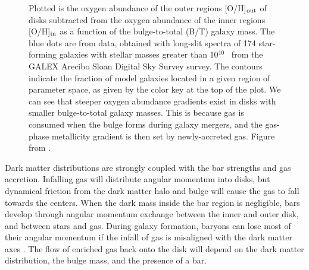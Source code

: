 \documentclass[11pt, a4paper, onecolumn]{article}
\begin{document}
\begin{multicols}{2}
\begin{figure}[!ht]
        \caption{\label{fig:fu} Plotted is the oxygen abundance of the outer
            regions [O/H]$_{\rm out}$ of disks subtracted from the oxygen
            abundance of the inner regions [O/H]$_{\rm in}$ as a function of
            the bulge-to-total (B/T) galaxy mass. The blue dots are from
            \citet{moran12} data, obtained with long-slit spectra of 174
            star-forming galaxies with stellar masses greater than 10$^{10}$
            \msun\ from the GALEX Arecibo Sloan Digital Sky Survey survey. The
            contours indicate the fraction of model galaxies located in a given
            region of parameter space, as given by the color key at the top of
            the plot. We can see that steeper oxygen abundance gradients exist
            in disks with smaller bulge-to-total galaxy masses.  This is
            because gas is consumed when the bulge forms during galaxy mergers,
            and the gas-phase metallicity gradient is then set by
        newly-accreted gas. Figure from \citet{fu13}.\/}

    \end{figure}

    Dark matter distributions are strongly coupled with the bar strengths and
    gas accretion. Infalling gas will distribute angular momentum into
    disks, but dynamical friction from the dark matter halo and bulge will
    cause the gas to fall towards the centers. When the dark mass inside the
    bar region is negligible, bars develop through angular momentum exchange
    between the inner and outer disk, and between stars and gas. During galaxy
    formation, baryons can lose most of their angular momentum if the infall of
    gas is misaligned with the dark matter axes \citep{combes13}. The flow of
    enriched gas back onto the disk will depend on the dark matter
    distribution, the bulge mass, and the presence of a bar.

\end{multicols}
\end{document}

